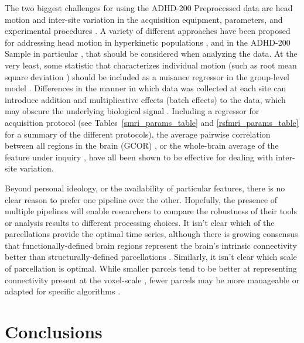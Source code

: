 \documentclass[preprint,12pt,3p]{elsarticle}
\begin{document}
The two biggest challenges for using the ADHD-200 Preprocessed data are head motion \cite{power2012, vandijk2012, sattertwhaite2012, fair2012adhd200, yan2013motion, yan2013small} and inter-site variation in the acquisition equipment, parameters, and experimental procedures \cite{Olivetti2012,yan2013std}. A variety of different approaches have been proposed for addressing head motion in hyperkinetic populations \cite{power2012, sattertwhaite2013}, and in the ADHD-200 Sample in particular \cite{fair2012adhd200}, that should be considered when analyzing the data. At the very least, some statistic that characterizes individual motion (such as root mean square deviation \cite{JenkinsonTR99}) should be included as a nuisance regressor in the group-level model \cite{sattertwhaite2012, yan2013motion}. Differences in the manner in which data was collected at each site can introduce addition and multiplicative effects (batch effects) to the data, which may obscure the underlying biological signal \cite{Olivetti2012,yan2013std}. Including a regressor for acquisition protocol (see Tables~\ref{smri_params_table} and \ref{rsfmri_params_table} for a summary of the different protocols), the average pairwise correlation between all regions in the brain (GCOR) \cite{saad2013gcor}, or the whole-brain average of the feature under inquiry \cite{yan2013std}, have all been shown to be effective for dealing with inter-site variation. 


Beyond personal ideology, or the availability of particular features, there is no clear reason to prefer one pipeline over the other. Hopefully, the presence of multiple pipelines will enable researchers to compare the robustness of their tools or analysis results to different processing choices. It isn't clear which of the parcellations provide the optimal time series, although there is growing consensus that functionally-defined brain regions represent the brain's intrinsic connectivity better than structurally-defined parcellations \cite{craddock2012whole, Blumensath2013, thirion2014}. Similarly, it isn't clear which scale of parcellation is optimal. While smaller parcels tend to be better at representing connectivity present at the voxel-scale \cite{bellec2006identification, craddock2012whole, thirion2014}, fewer parcels may be more manageable or adapted for specific algorithms \cite[e.g.]{michel2012supervised,bellec2015impact}. 


\section{Conclusions}
\end{document}
